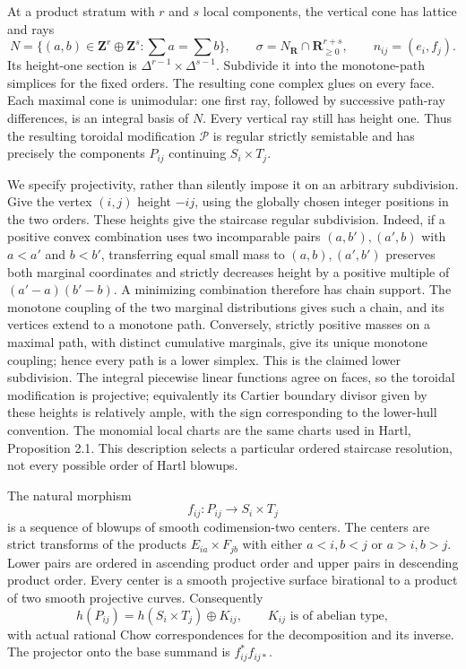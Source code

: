 At a product stratum with $r$ and $s$ local components, the vertical
cone has lattice and rays
\[
 N=\{(a,b)\in\mathbf Z^r\oplus\mathbf Z^s:
              \textstyle\sum a=\sum b\},\qquad
 \sigma=N_{\mathbf R}\cap\mathbf R_{\geq0}^{r+s},\qquad
 n_{ij}=(e_i,f_j).
 \tag{PX20.1}
\]
Its height-one section is $\Delta^{r-1}\times\Delta^{s-1}$.
Subdivide it into the monotone-path simplices for the fixed orders.
The resulting cone complex glues on every face. Each maximal cone is
unimodular: one first ray, followed by successive path-ray differences,
is an integral basis of $N$. Every vertical ray still has height one.
Thus the resulting toroidal modification $\mathcal P$ is regular
strictly semistable and has precisely the components $P_{ij}$
continuing $S_i\times T_j$.

We specify projectivity, rather than silently impose it on an arbitrary
subdivision. Give the vertex $(i,j)$ height $-ij$, using the globally
chosen integer positions in the two orders. These heights give the
staircase regular subdivision. Indeed, if a positive convex
combination uses two incomparable pairs $(a,b'),(a',b)$ with
$a<a'$ and $b<b'$, transferring equal small mass to
$(a,b),(a',b')$ preserves both marginal coordinates and strictly
decreases height by a positive multiple of
$(a'-a)(b'-b)$. A minimizing combination therefore has chain support.
The monotone coupling of the two marginal distributions gives such
a chain, and its vertices extend to a monotone path. Conversely,
strictly positive masses on a maximal path, with distinct cumulative
marginals, give its unique monotone coupling; hence every path is a
lower simplex. This is the claimed lower subdivision. The integral
piecewise linear functions
agree on faces, so the toroidal modification is projective; equivalently
its Cartier boundary divisor given by these heights is relatively
ample, with the sign corresponding to the lower-hull convention.
The monomial local charts are the same charts used in Hartl,
Proposition 2.1. This description selects a particular ordered
staircase resolution, not every possible order of Hartl blowups.

\begin{lemma}
\label{r20px:tower}
The natural morphism
\[
                f_{ij}:P_{ij}\longrightarrow S_i\times T_j
 \tag{PX20.2}
\]
is a sequence of blowups of smooth codimension-two centers. The
centers are strict transforms of the products $E_{ia}\times F_{jb}$
with either $a<i,b<j$ or $a>i,b>j$. Lower pairs are ordered in
ascending product order and upper pairs in descending product order.
Every center is a smooth projective surface birational to a product
of two smooth projective curves. Consequently
\[
 h(P_{ij})=h(S_i\times T_j)\oplus K_{ij},
 \qquad K_{ij}\text{ is of abelian type},
 \tag{PX20.3}
\]
with actual rational Chow correspondences for the decomposition and
its inverse. The projector onto the base summand is
$f_{ij}^{*}f_{ij*}$.
\end{lemma}

